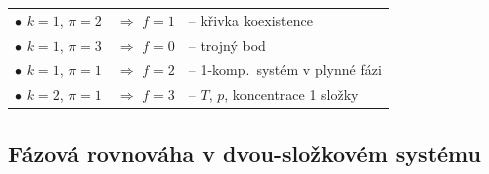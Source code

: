 \begin{priklad}[Př]
\begin{tabular}{@{}l@{\quad}l@{\quad}l}
$\bullet$ $k = 1$, $\pi = 2$ & $\Rightarrow$ $f = 1$ & -- křivka koexistence \\
$\bullet$ $k = 1$, $\pi = 3$ & $\Rightarrow$ $f = 0$ & -- trojný bod \\
$\bullet$ $k = 1$, $\pi = 1$ & $\Rightarrow$ $f = 2$ & -- 1-komp.\ systém v plynné fázi \\
$\bullet$ $k = 2$, $\pi = 1$ & $\Rightarrow$ $f = 3$ & -- $T$, $p$, koncentrace 1 složky
\end{tabular}
\end{priklad}

\subsection{Fázová rovnováha v dvou-složkovém systému}

